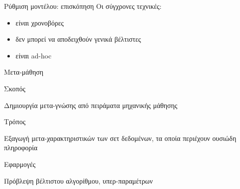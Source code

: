 \documentclass{beamer}
\begin{document}
    \begin{frame} {Ρύθμιση μοντέλου: επισκόπηση}
    Οι σύγχρονες τεχνικές:
    \begin{itemize}
    	\item είναι χρονοβόρες
    	\item δεν μπορεί να αποδειχθούν γενικά βέλτιστες
    	\item είναι ad-hoc
    \end{itemize}
    \end{frame}
  \begin{frame}{Μετα-μάθηση}
  	\begin{minipage}[t]{.3\textwidth}  		
  		Σκοπός
  		\vspace{4ex}
  	\end{minipage}%
  	\begin{minipage}[t]{.6\textwidth}
  		Δημιουργία μετα-γνώσης από πειράματα μηχανικής μάθησης  	
  		\vspace{4ex}
  	\end{minipage}
  	\begin{minipage}[t]{.3\textwidth}  		
  		Τρόπος
  		\vspace{4ex}
  	\end{minipage}%
  	\begin{minipage}[t]{.6\textwidth}
  		Εξαγωγή μετα-χαρακτηριστικών των σετ δεδομένων, τα οποία περιέχουν ουσιώδη πληροφορία
  		\vspace{4ex} 
  	\end{minipage}
  	\begin{minipage}[t]{.3\textwidth}  		
  		Εφαρμογές
  		\vspace{4ex}
  	\end{minipage}%
  	\begin{minipage}[t]{.6\textwidth}
  		Πρόβλεψη βέλτιστου αλγορίθμου, υπερ-παραμέτρων 
  		\vspace{4ex}
  	\end{minipage}
  \end{frame}
\end{document}
